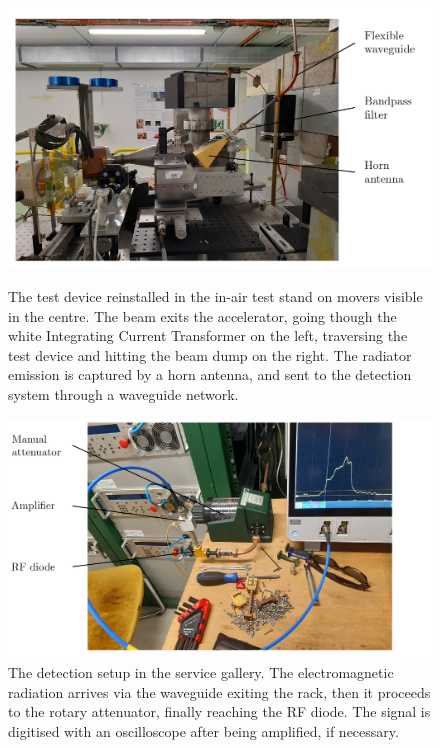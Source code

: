 \begin{figure}[!t]
\centering
\includegraphics[width=13 cm, keepaspectratio]{pictures/setup-down-caption}
\caption{The test device reinstalled in the in-air test stand on movers visible in the centre. The beam exits the accelerator, going though the white Integrating Current Transformer on the left, traversing the test device and hitting the beam dump on the right. The radiator emission is captured by a horn antenna, and sent to the detection system through a waveguide network. }
\label{fig:clear_single_horn}

\hspace{40mm}
\includegraphics[width=14cm, keepaspectratio]{pictures/setup-up-caption}
\caption{The detection setup in the service gallery. The electromagnetic radiation arrives via the waveguide exiting the rack, then it proceeds to the rotary attenuator, finally reaching the RF diode. The signal is digitised with an oscilloscope after being amplified, if necessary.}
\label{fig:clear_single_detection}
\end{figure}

